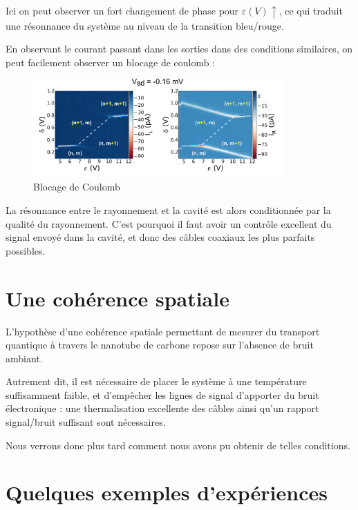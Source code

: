 Ici on peut observer un fort changement de phase pour $\varepsilon(V) \uparrow$, ce qui traduit une résonnance du système au niveau de la transition bleu/rouge.\newline

En observant le courant passant dans les sorties dans des conditions similaires, on peut facilement observer un blocage de coulomb :
\begin{figure}[h]
    \begin{center}
        \includegraphics[width=0.85\textwidth]{Images/Exp/CoulombBlockade}
        \caption{Blocage de Coulomb}
        \label{expe_blocagecoulomb}
    \end{center}
\end{figure}

La résonnance entre le rayonnement et la cavité est alors conditionnée par la qualité du rayonnement. C'est pourquoi il faut avoir un contrôle excellent du signal envoyé dans la cavité, et donc des câbles coaxiaux les plus parfaits possibles.


\section{Une cohérence spatiale}
L'hypothèse d'une cohérence spatiale permettant de mesurer du transport quantique à travers le nanotube de carbone repose sur l'absence de bruit ambiant.

Autrement dit, il est nécessaire de placer le système à une température suffisamment faible, et d'empêcher les lignes de signal d'apporter du bruit électronique : une thermalisation excellente des câbles ainsi qu'un rapport signal/bruit suffisant sont nécessaires.\newline

Nous verrons donc plus tard comment nous avons pu obtenir de telles conditions.

\section{Quelques exemples d'expériences}
